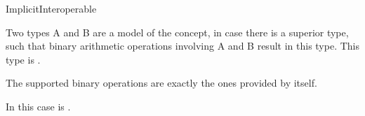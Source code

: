 \begin{ccRefConcept}{ImplicitInteroperable}

\ccDefinition

Two types A and B are a model of the  concept,
in case there is a superior type, such that binary arithmetic operations
involving A and B result in this type. 
This type is . 

The supported binary operations are exactly the ones provided by 
 itself. 

In this case  
is .

\ccRefines
 
\ccSeeAlso
{}\\
\\

\end{ccRefConcept}
